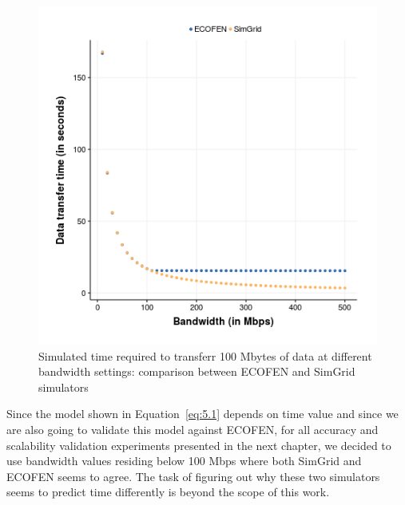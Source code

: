 \begin{figure}[ht]
	\begin{center}
		\includegraphics[width=14cm]{images/ex18_bw_time_sg_vs_ns3}
		\caption{Simulated time required to transferr 100 Mbytes of data at different bandwidth settings: comparison between ECOFEN and SimGrid simulators}
		\label{fig:bandwidthvstime}
	\end{center}
\end{figure}

Since the model shown in Equation~\ref{eq:5.1} depends on time value and since we are also going to validate this model against ECOFEN, for all accuracy and scalability validation experiments presented in the next chapter, we decided to use bandwidth values residing below 100 Mbps where both SimGrid and ECOFEN seems to agree. The task of figuring out why these two simulators seems to predict time differently is beyond the scope of this work. 

